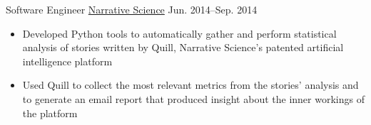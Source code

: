\begin{entrylist}

\entry
{Software Engineer}
{\href{https://narrativescience.com/}{Narrative Science}}
{Jun. 2014--Sep. 2014}
{\begin{itemize}
\item Developed Python tools to automatically gather and perform statistical analysis of stories written by Quill, Narrative Science's patented artificial intelligence platform
\item Used Quill to collect the most relevant metrics from the stories' analysis and to generate an email report that produced insight about the inner workings of the platform
\end{itemize}}


\end{entrylist}
